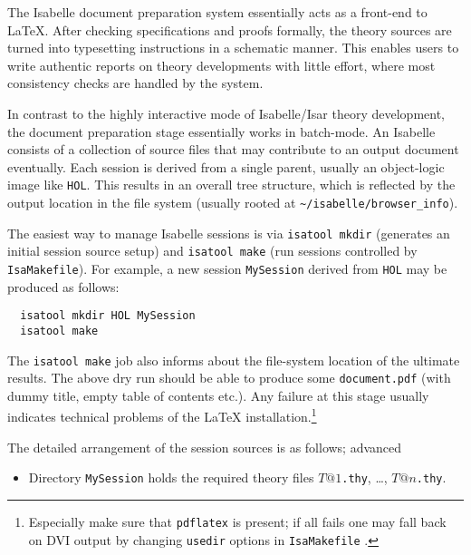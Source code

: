 \begin{isabellebody}
\begin{isamarkuptext}
  \medskip The Isabelle document preparation system essentially acts
  as a front-end to {\LaTeX}.  After checking specifications and
  proofs formally, the theory sources are turned into typesetting
  instructions in a schematic manner.  This enables users to write
  authentic reports on theory developments with little effort, where
  most consistency checks are handled by the system.%
\end{isamarkuptext}%
\isamarkuptrue%
%
\isamarkuptrue%
%
\begin{isamarkuptext}%
In contrast to the highly interactive mode of Isabelle/Isar theory
  development, the document preparation stage essentially works in
  batch-mode.  An Isabelle  consists of a collection
  of source files that may contribute to an output document
  eventually.  Each session is derived from a single parent, usually
  an object-logic image like \texttt{HOL}.  This results in an overall
  tree structure, which is reflected by the output location in the
  file system (usually rooted at \verb,~/isabelle/browser_info,).

  \medskip The easiest way to manage Isabelle sessions is via
  \texttt{isatool mkdir} (generates an initial session source setup)
  and \texttt{isatool make} (run sessions controlled by
  \texttt{IsaMakefile}).  For example, a new session
  \texttt{MySession} derived from \texttt{HOL} may be produced as
  follows:

\begin{verbatim}
  isatool mkdir HOL MySession
  isatool make
\end{verbatim}

  The \texttt{isatool make} job also informs about the file-system
  location of the ultimate results.  The above dry run should be able
  to produce some \texttt{document.pdf} (with dummy title, empty table
  of contents etc.).  Any failure at this stage usually indicates
  technical problems of the {\LaTeX} installation.\footnote{Especially
  make sure that \texttt{pdflatex} is present; if all fails one may
  fall back on DVI output by changing \texttt{usedir} options in
  \texttt{IsaMakefile} \cite{isabelle-sys}.}

  \medskip The detailed arrangement of the session sources is as
  follows; advanced

  \begin{itemize}

  \item Directory \texttt{MySession} holds the required theory files
  $T@1$\texttt{.thy}, \dots, $T@n$\texttt{.thy}.


\end{itemize}
\end{isamarkuptext}
\end{isabellebody}
